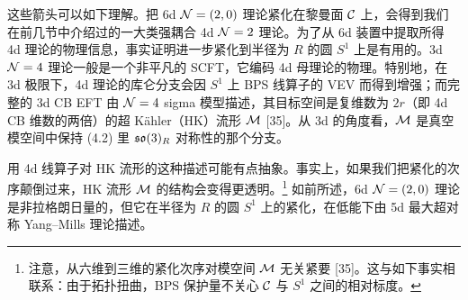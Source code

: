 这些箭头可以如下理解。把 6d $\mathcal{N}=(2,0)$ 理论紧化在黎曼面 $\mathcal{C}$ 上，会得到我们在前几节中介绍过的一大类强耦合 4d $\mathcal{N}=2$ 理论。为了从 6d 装置中提取所得 4d 理论的物理信息，事实证明进一步紧化到半径为 $R$ 的圆 $S^1$ 上是有用的。3d $\mathcal{N}=4$ 理论一般是一个非平凡的 SCFT，它编码 4d 母理论的物理。特别地，在 3d 极限下，4d 理论的库仑分支会因 $S^1$ 上 BPS 线算子的 VEV 而得到增强；而完整的 3d CB EFT 由 $\mathcal{N}=4$ sigma 模型描述，其目标空间是复维数为 $2r$（即 4d CB 维数的两倍）的超 Kähler（HK）流形 $\mathcal{M}$ [35]。从 3d 的角度看，$\mathcal{M}$ 是真空模空间中保持 (4.2) 里 $\mathfrak{so}(3)_R$ 对称性的那个分支。

用 4d 线算子对 HK 流形的这种描述可能有点抽象。事实上，如果我们把紧化的次序颠倒过来，HK 流形 $\mathcal{M}$ 的结构会变得更透明。\footnote{注意，从六维到三维的紧化次序对模空间 $\mathcal{M}$ 无关紧要 [35]。这与如下事实相联系：由于拓扑扭曲，BPS 保护量不关心 $\mathcal{C}$ 与 $S^1$ 之间的相对标度。} 如前所述，6d $\mathcal{N}=(2,0)$ 理论是非拉格朗日量的，但它在半径为 $R$ 的圆 $S^1$ 上的紧化，在低能下由 5d 最大超对称 Yang--Mills 理论描述。
